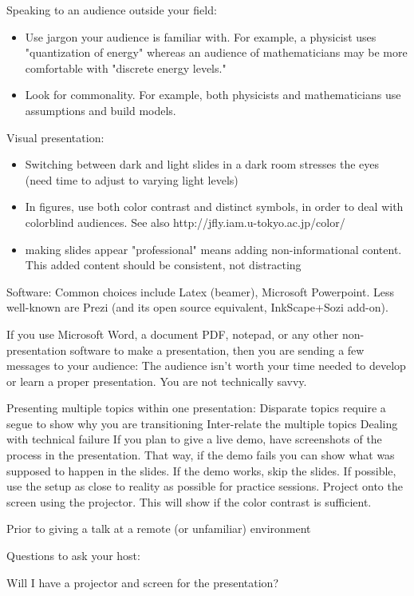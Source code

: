 Speaking to an audience outside your field:
\begin{itemize}
    \item Use jargon your audience is familiar with. For example, a physicist uses "quantization of energy" whereas an audience of mathematicians may be more comfortable with "discrete energy levels."
    \item Look for commonality. For example, both physicists and mathematicians use assumptions and build models.
\end{itemize}
Visual presentation:
\begin{itemize}
    \item Switching between dark and light slides in a dark room stresses the eyes (need time to adjust to varying light levels)
    \item In figures, use both color contrast and distinct symbols, in order to deal with colorblind audiences. See also http://jfly.iam.u-tokyo.ac.jp/color/
    \item making slides appear "professional" means adding non-informational content. This added content should be consistent, not distracting
\end{itemize}
Software:
Common choices include Latex (beamer), Microsoft Powerpoint. Less well-known are Prezi (and its open source equivalent, InkScape+Sozi add-on).

If you use Microsoft Word, a document PDF, notepad, or any other non-presentation software to make a presentation, then you are sending a few messages to your audience:
The audience isn't worth your time needed to develop or learn a proper presentation. 
You are not technically savvy.

Presenting multiple topics within one presentation:
Disparate topics require a segue to show why you are transitioning
Inter-relate the multiple topics 
Dealing with technical failure
If you plan to give a live demo, have screenshots of the process in the presentation. That way, if the demo fails you can show what was supposed to happen in the slides. If the demo works, skip the slides.
If possible, use the setup as close to reality as possible for practice sessions. Project onto the screen using the projector. This will show if the color contrast is sufficient.

Prior to giving a talk at a remote (or unfamiliar) environment

Questions to ask your host:

Will I have a projector and screen for the presentation?

